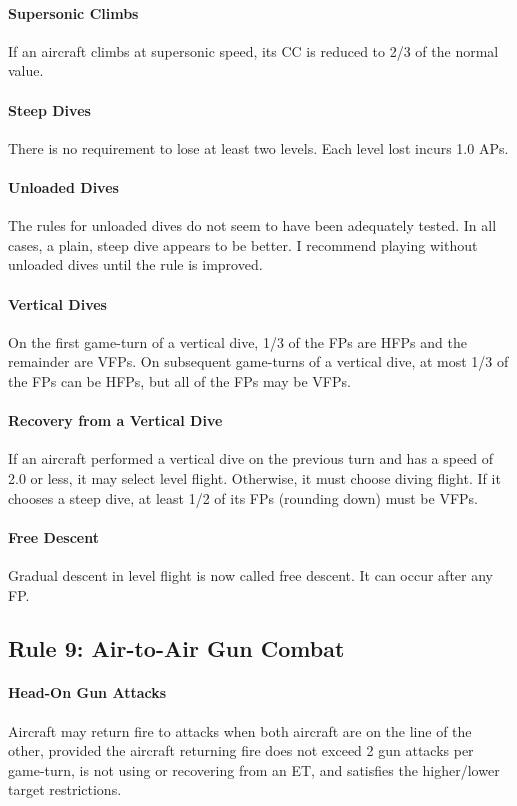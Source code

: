 \documentclass[10pt]{article}
\begin{document}
\paragraph{Supersonic Climbs} If an aircraft climbs at supersonic speed, its CC is reduced to 2/3 of the normal value.

\paragraph{Steep Dives} There is no requirement to lose at least two levels. Each level lost incurs 1.0 APs.

\paragraph{Unloaded Dives} The rules for unloaded dives do not seem to have been adequately tested. In all cases, a plain, steep dive appears to be better. I recommend playing without unloaded dives until the rule is improved.

\paragraph{Vertical Dives} On the first game-turn of a vertical dive, 1/3 of the FPs are HFPs and the remainder are VFPs. On subsequent game-turns of a vertical dive, at most 1/3 of the FPs can be HFPs, but all of the FPs may be VFPs.

\paragraph{Recovery from a Vertical Dive} If an aircraft performed a vertical dive on the previous turn and has a speed of 2.0 or less, it may select level flight. Otherwise, it must choose diving flight. If it chooses a steep dive, at least 1/2 of its FPs (rounding down) must be VFPs.

\paragraph{Free Descent} Gradual descent in level flight is now called free descent. It can occur after any FP.

\subsection{Rule 9: Air-to-Air Gun Combat}

\paragraph{Head-On Gun Attacks} Aircraft may return fire to attacks when both aircraft are on the  line of the other, provided the aircraft returning fire does not exceed 2 gun attacks per game-turn, is not using or recovering from an ET, and satisfies the higher/lower target restrictions.
\end{document}
